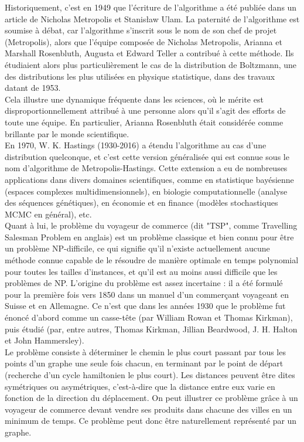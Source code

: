 \documentclass{article}
\begin{document}
Historiquement, c'est en 1949 que l'écriture de l'algorithme a été publiée dans un article de Nicholas Metropolis et Stanisław Ulam. La paternité de l'algorithme est soumise à débat, car l'algorithme s'inscrit sous le nom de son chef de projet (Metropolis), alors que l'équipe composée de Nicholas Metropolis, Arianna et Marshall Rosenbluth, Augusta et Edward Teller a contribué à cette méthode. Ils étudiaient alors plus particulièrement le cas de la distribution de Boltzmann, une des distributions les plus utilisées en physique statistique, dans des travaux datant de 1953. \\
Cela illustre une dynamique fréquente dans les sciences, où le mérite est disproportionnellement attribué à une personne alors qu'il s'agit des efforts de toute une équipe. En particulier, Arianna Rosenbluth était considérée comme brillante par le monde scientifique. \\

En 1970, W. K. Hastings (1930-2016) a étendu l'algorithme au cas d'une distribution quelconque, et c'est cette version généralisée qui est connue sous le nom d'algorithme de Metropolis-Hastings. Cette extension a eu de nombreuses applications dans divers domaines scientifiques, comme en statistique bayésienne (espaces complexes multidimensionnels), en biologie computationnelle (analyse des séquences génétiques), en économie et en finance (modèles stochastiques MCMC en général), etc. \\

Quant à lui, le problème du voyageur de commerce (dit "TSP", comme Travelling Salesman Problem en anglais) est un problème classique et bien connu pour être un problème NP-difficile, ce qui signifie qu'il n'existe actuellement aucune méthode connue capable de le résoudre de manière optimale en temps polynomial pour toutes les tailles d'instances, et qu'il est au moins aussi difficile que les problèmes de NP. 
L'origine du problème est assez incertaine : il a été formulé pour la première fois vers 1850 dans un manuel d'un commerçant voyageant en Suisse et en Allemagne. Ce n'est que dans les années 1930 que le problème fut énoncé d'abord comme un casse-tête (par William Rowan et Thomas Kirkman), puis étudié (par, entre autres, Thomas Kirkman, Jillian Beardwood, J. H. Halton et John Hammersley). \\ 
Le problème consiste à déterminer le chemin le plus court passant par tous les points d'un graphe une seule fois chacun, en terminant par le point de départ (recherche d'un cycle hamiltonien le plus court). Les distances peuvent être dites symétriques ou asymétriques, c'est-à-dire que la distance entre eux varie en fonction de la direction du déplacement. On peut illustrer ce problème grâce à un voyageur de commerce devant vendre ses produits dans chacune des villes en un minimum de temps. Ce problème peut donc être naturellement représenté par un graphe.\\
\end{document}
